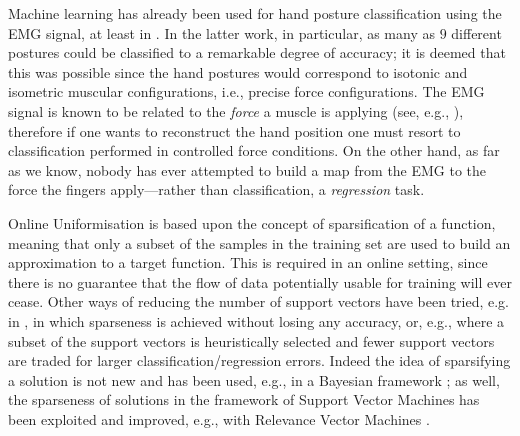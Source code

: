 Machine learning has already been used for hand posture classification
using the EMG signal, at least in \cite{dunlop,fukuda,smagt}. In the
latter work, in particular, as many as $9$ different postures could be
classified to a remarkable degree of accuracy; it is deemed that this
was possible since the hand postures would correspond to isotonic and
isometric muscular configurations, i.e., precise force
configurations. The EMG signal is known to be related to the
\emph{force} a muscle is applying (see, e.g., \cite{deluca}),
therefore if one wants to reconstruct the hand position one must
resort to classification performed in controlled force conditions. On
the other hand, as far as we know, nobody has ever attempted to build
a map from the EMG to the force the fingers apply---rather than
classification, a \emph{regression} task.

Online Uniformisation is based upon the concept of sparsification of a
function, meaning that only a subset of the samples in the training
set are used to build an approximation to a target function. This is
required in an online setting, since there is no guarantee that the
flow of data potentially usable for training will ever cease. Other
ways of reducing the number of support vectors have been tried, e.g.
in \cite{bmvc}, in which sparseness is achieved without losing any
accuracy, or, e.g., \cite{LeeM01,KeerthiCDC06} where a subset of the
support vectors is heuristically selected and fewer support vectors
are traded for larger classification/regression errors. Indeed the
idea of sparsifying a solution is not new and has been used, e.g., in
a Bayesian framework \cite{figueiredo03adaptive}; as well, the
sparseness of solutions in the framework of Support Vector Machines
has been exploited and improved, e.g., with Relevance Vector Machines
\cite{tipping00relevance}.
